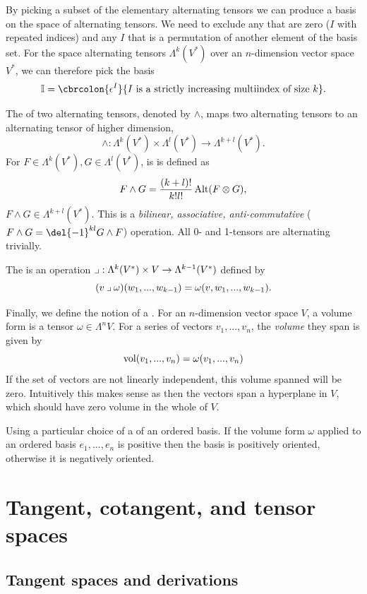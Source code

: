By picking a subset of the elementary alternating tensors we can produce a basis on the space of alternating tensors.
We need to exclude any that are zero (\(I\) with repeated indices) and any \(I\) that is a permutation of another element of the basis set. 
For the space alternating tensors \(\Lambda^k(V^*)\) over an \(n\)-dimension vector space \(V^*\), we can therefore pick the basis
\[  \bb{I} = \cbrcolon{\epsilon^I}{ I \text{ is a strictly increasing multiindex of size } k} .\]


The  of two alternating tensors, denoted by \(\wedge\), maps two alternating tensors to an alternating tensor of higher dimension, \[\wedge: \Lambda^k(V^*) \times \Lambda^l(V^*) \to \Lambda^{k+l}(V^*) .\]
For \(F\in \Lambda^k(V^*), G\in \Lambda^l(V^*)\), is is defined as \[ F\wedge G = \frac{(k+l)!
	}{k!l!} \operatorname{Alt} (F\otimes G) ,\] \(F\wedge G \in  \Lambda^{k+l}(V^*)\).
This is a \emph{bilinear, associative, anti-commutative} (\(F\wedge G = \del{-1}^{kl}G\wedge F\)) operation.
All 0- and 1-tensors are alternating trivially.

The  is an operation \(\mathbin{\lrcorner}: \Lambda^k(V^*) \times V \to \Lambda^{k-1}(V^*)\) defined by \[(v\mathbin{\lrcorner} \omega)(w_1, .
	.., w_{k-1}) = \omega(v, w_1, ..., w_{k-1}).\]

Finally, we define the notion of a .
For an \(n\)-dimension vector space \(V\), a volume form is a tensor \(\omega\in \Lambda^n V\).
For a series of vectors \(v_1, ..., v_n\), the \emph{volume} they span is given by
\[
	\operatorname{vol}(v_1, ..., v_n)	= \omega(v_1, ..., v_n)	
\]
If the set of vectors are not linearly independent, this volume spanned will be zero.
Intuitively this makes sense as then the vectors span a hyperplane in \(V\), which should have zero volume in the whole of \(V\).

Using a particular choice of a  of an ordered basis.
If the volume form \(\omega\) applied to an ordered basis \(e_1, ..., e_n\) is positive then the basis is positively oriented, otherwise it is negatively oriented.

\section{Tangent, cotangent, and tensor spaces}
\label{sec:tensor_spaces}
\subsection{Tangent spaces and derivations}
\label{sec:tangents_derivations}

